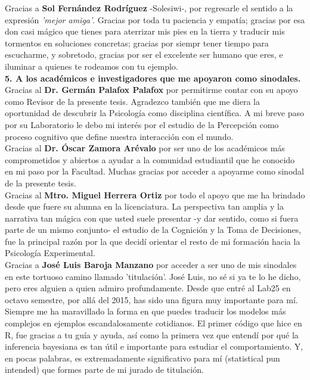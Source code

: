 \documentclass[
12pt, %
spanish, %
onehalfspacing, %
headsepline, %
]{MastersDoctoralThesis} %
\begin{document}
\begin{acknowledgements}
Gracias a \textbf{Sol Fernández Rodríguez} -Solesiwi-, por regresarle el sentido a la expresión \textit{'mejor amiga'}. Gracias por toda tu paciencia y empatía; gracias por esa don casi mágico que tienes para aterrizar mis pies en la tierra y traducir mis tormentos en soluciones concretas; gracias por siempr tener tiempo para escucharme, y sobretodo, gracias por ser el excelente ser humano que eres, e iluminar a quienes te rodeamos con tu ejemplo.\\


\textbf{5. A los académicos e investigadores que me apoyaron como sinodales.}\\

Gracias al \textbf{Dr. Germán Palafox Palafox} por permitirme contar con su apoyo como Revisor de la presente tesis. Agradezco también que me diera la oportunidad de descubrir la Psicología como disciplina científica. A mi breve paso por su Laboratorio le debo mi interés por el estudio de la Percepción como proceso cognitivo que define nuestra interacción con el mundo.\\

Gracias al \textbf{Dr. Óscar Zamora Arévalo} por ser uno de los académicos más comprometidos y abiertos a ayudar a la comunidad estudiantil que he conocido en mi paso por la Facultad. Muchas gracias por acceder a apoyarme como sinodal de la presente tesis.\\

Gracias al \textbf{Mtro. Miguel Herrera Ortiz} por todo el apoyo que me ha brindado desde que fuere su alumna en la licenciatura. La perspectiva tan amplia y la narrativa tan mágica con que usted suele presentar -y dar sentido, como si fuera parte de un mismo conjunto- el estudio de la Cognición y la Toma de Decisiones, fue la principal razón por la que decidí orientar el resto de mi formación hacia la Psicología Experimental.\\

Gracias a \textbf{José Luis Baroja Manzano} por acceder a ser uno de mis sinodales en este tortuoso camino llamado 'titulación'. José Luis, no sé si ya te lo he dicho, pero eres alguien a quien admiro profundamente. Desde que entré al Lab25 en octavo semestre, por allá del 2015, has sido una figura muy importante para mí. Siempre me ha maravillado la forma en que puedes traducir los modelos más complejos en ejemplos escandalosamente cotidianos. El primer código que hice en R, fue gracias a tu guía y ayuda, así como la primera vez que entendí por qué la inferencia bayesiana es tan útil e importante para estudiar el comportamiento. Y, en pocas palabras, es extremadamente significativo para mí (statistical pun intended) que formes parte de mi jurado de titulación.\\


\end{acknowledgements}
\end{document}

